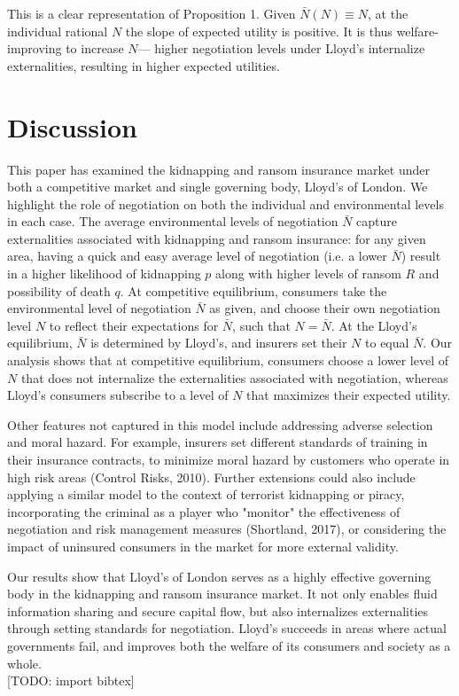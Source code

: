 \documentclass[12pt]{article}
\theoremstyle{plain}
\begin{document}
This is a clear representation of Proposition 1. Given $\bar{N}(N)\equiv N$, at the individual rational $N$ the slope of expected utility is positive. It is thus welfare-improving to increase $N$--- higher negotiation levels under Lloyd's internalize externalities, resulting in higher expected utilities.

\section{Discussion}

This paper has examined the kidnapping and ransom insurance market under both a competitive market and single governing body, Lloyd's of London. We highlight the role of negotiation on both the individual and environmental levels in each case. The average environmental levels of negotiation $\bar{N}$ capture externalities associated with kidnapping and ransom insurance: for any given area, having a quick and easy average level of negotiation (i.e. a lower $\bar{N}$) result in a higher likelihood of kidnapping $p$ along with higher levels of ransom $R$ and possibility of death $q$. At competitive equilibrium, consumers take the environmental level of negotiation $\bar{N}$ as given, and choose their own negotiation level $N$ to reflect their expectations for $\bar{N}$, such that $N=\bar{N}$. At the Lloyd's equilibrium, $\bar{N}$ is determined by Lloyd's, and insurers set their $N$ to equal $\bar{N}$. Our analysis shows that at competitive equilibrium, consumers choose a lower level of $N$ that does not internalize the externalities associated with negotiation, whereas Lloyd's consumers subscribe to a level of $N$ that maximizes their expected utility.

Other features not captured in this model include addressing adverse selection and moral hazard. For example, insurers set different standards of training in their insurance contracts, to minimize moral hazard by customers who operate in high risk areas (Control Risks, 2010). Further extensions could also include applying a similar model to the context of terrorist kidnapping or piracy, incorporating the criminal as a player who "monitor" the effectiveness of negotiation and risk management measures (Shortland, 2017), or considering the impact of uninsured consumers in the market for more external validity.

Our results show that Lloyd's of London serves as a highly effective governing body in the kidnapping and ransom insurance market. It not only enables fluid information sharing and secure capital flow, but also internalizes externalities through setting standards for negotiation. Lloyd's succeeds in areas where actual governments fail, and improves both the welfare of its consumers and society as a whole.
\\

[TODO: import bibtex]
\end{document}
